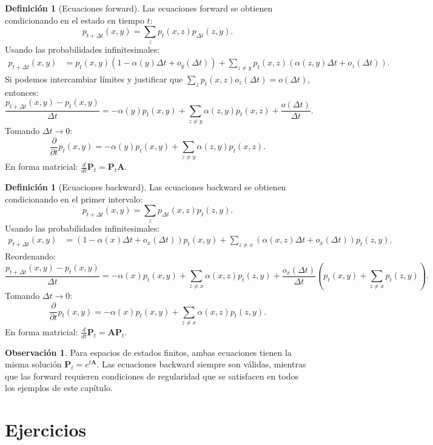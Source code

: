 \documentclass{article}
\theoremstyle{plain}
\theoremstyle{definition}
\newtheorem{Definicion}[Teorema]{Definici\'on}
\newtheorem{Observacion}[Teorema]{Observaci\'on}
\newcommand{\A}{\mathbf{A}}
\newcommand{\PP}{\mathbf{P}}
\begin{document}
\begin{Definicion}[Ecuaciones forward]
  Las ecuaciones forward se obtienen condicionando en el estado en tiempo $t$:
  \[ p_{t+\Delta t}(x,y) = \sum_z p_t(x,z) p_{\Delta t}(z,y). \]
  Usando las probabilidades infinitesimales:
  \begin{align*}
    p_{t+\Delta t}(x,y) &= p_t(x,y)(1 - \alpha(y)\Delta t + o_y(\Delta t)) + \sum_{z \neq y} p_t(x,z)(\alpha(z,y)\Delta t + o_z(\Delta t)).
  \end{align*}
  Si podemos intercambiar l\'imites y justificar que $\sum_z p_t(x,z) o_z(\Delta t) = o(\Delta t)$, entonces:
  \[ \frac{p_{t+\Delta t}(x,y) - p_t(x,y)}{\Delta t} = -\alpha(y)p_t(x,y) + \sum_{z \neq y} \alpha(z,y)p_t(x,z) + \frac{o(\Delta t)}{\Delta t}. \]
  Tomando $\Delta t \to 0$:
  \[ \frac{\partial}{\partial t} p_t(x,y) = -\alpha(y)p_t(x,y) + \sum_{z \neq y} \alpha(z,y)p_t(x,z). \]
  En forma matricial: $\frac{d}{dt} \PP_t = \PP_t \A$.
\end{Definicion}

\begin{Definicion}[Ecuaciones backward]
  Las ecuaciones backward se obtienen condicionando en el primer intervalo:
  \[ p_{t+\Delta t}(x,y) = \sum_z p_{\Delta t}(x,z) p_t(z,y). \]
  Usando las probabilidades infinitesimales:
  \begin{align*}
    p_{t+\Delta t}(x,y) &= (1 - \alpha(x)\Delta t + o_x(\Delta t))p_t(x,y) + \sum_{z \neq x} (\alpha(x,z)\Delta t + o_x(\Delta t)) p_t(z,y).
  \end{align*}
  Reordenando:
  \[ \frac{p_{t+\Delta t}(x,y) - p_t(x,y)}{\Delta t} = -\alpha(x)p_t(x,y) + \sum_{z \neq x} \alpha(x,z)p_t(z,y) + \frac{o_x(\Delta t)}{\Delta t}\left(p_t(x,y) + \sum_{z \neq x} p_t(z,y)\right). \]
  Tomando $\Delta t \to 0$:
  \[ \frac{\partial}{\partial t} p_t(x,y) = -\alpha(x)p_t(x,y) + \sum_{z \neq x} \alpha(x,z)p_t(z,y). \]
  En forma matricial: $\frac{d}{dt} \PP_t = \A \PP_t$.
\end{Definicion}

\begin{Observacion}
  Para espacios de estados finitos, ambas ecuaciones tienen la misma soluci\'on $\PP_t = e^{t\A}$. Las ecuaciones backward siempre son v\'alidas, mientras que las forward requieren condiciones de regularidad que se satisfacen en todos los ejemplos de este cap\'itulo.
\end{Observacion}

\section{Ejercicios}
\end{document}
